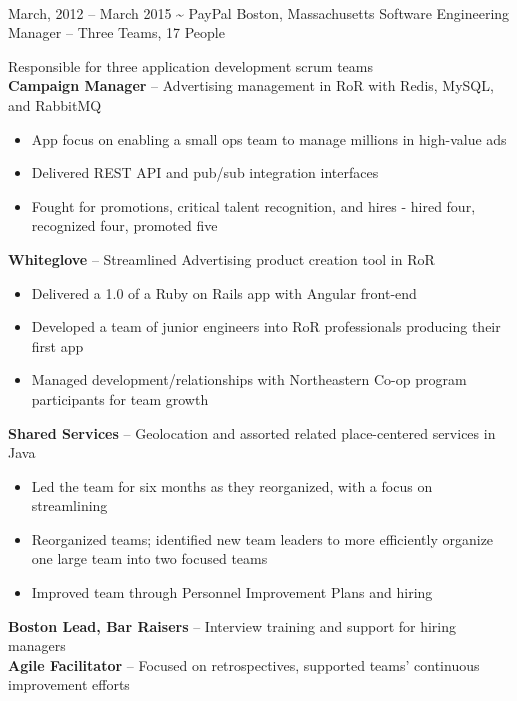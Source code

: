\documentclass[]{friggeri-cv}
\begin{document}
\begin{entrylist}
  \\[1cm]%
  \entryalt
    {March, 2012 -- March 2015}
    {\textbf{\textasciitilde} PayPal}
    {Boston, Massachusetts}
    {Software Engineering Manager -- Three Teams, 17 People}
    {Responsible for three application development scrum teams \\
      \textbf{Campaign Manager} -- Advertising management in RoR with Redis, MySQL,
      and RabbitMQ
    \begin{itemize}
      \item App focus on enabling a small ops team to manage millions in
        high-value ads
      \item Delivered REST API and pub/sub integration interfaces
      \item Fought for promotions, critical talent recognition, and hires - hired four, recognized four, promoted five
    \end{itemize}
      \textbf{Whiteglove} -- Streamlined Advertising product creation tool in RoR
    \begin{itemize}
      \item Delivered a 1.0 of a Ruby on Rails app with Angular front-end
      \item Developed a team of junior engineers into RoR professionals producing their first app
      \item Managed development/relationships with Northeastern Co-op program
        participants for team growth
    \end{itemize} 
      \textbf{Shared Services} -- Geolocation and assorted related place-centered
      services in Java
    \begin{itemize}
      \item Led the team for six months as they reorganized, with a focus on
        streamlining
      \item Reorganized teams; identified new team leaders to more efficiently organize one large team into two focused teams
      \item Improved team through Personnel Improvement Plans and hiring
    \end{itemize}
    \textbf{Boston Lead, Bar Raisers} -- Interview training and support for hiring managers\\
    \textbf{Agile Facilitator} -- Focused on retrospectives, supported teams' continuous improvement efforts}


\end{entrylist}
\end{document}
